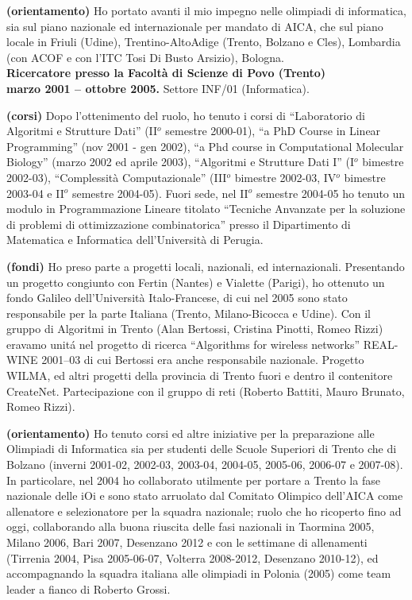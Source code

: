 \documentclass[10pt]{article}
\newcommand{\subvoice}[1] { {\large \bf #1} \smallskip\\ }
\begin{document}
{\bf (orientamento)} Ho portato avanti il mio impegno nelle olimpiadi di informatica,
sia sul piano nazionale ed internazionale per mandato di AICA,
che sul piano locale in Friuli (Udine), Trentino-AltoAdige (Trento, Bolzano e Cles), Lombardia (con ACOF e con l'ITC Tosi Di Busto Arsizio), Bologna.\\



\subvoice{Ricercatore presso la
          Facolt\`a di Scienze di Povo (Trento)}
{\bf marzo 2001 -- ottobre 2005.}
Settore INF/01 (Informatica).

{\bf (corsi)} Dopo l'ottenimento del ruolo,
ho tenuto i corsi di ``Laboratorio di Algoritmi e Strutture Dati''
(II$^o$ semestre 2000-01),
``a PhD Course in Linear Programming'' (nov 2001 - gen 2002),
``a Phd course in Computational Molecular Biology'' (marzo 2002 ed aprile 2003),
``Algoritmi e Strutture Dati I'' (I$^o$ bimestre 2002-03),
``Complessit\`a Computazionale'' (III$^o$ bimestre 2002-03,
IV$^o$ bimestre 2003-04 e II$^o$ semestre 2004-05).
Fuori sede, nel II$^o$ semestre 2004-05
ho tenuto un modulo in Programmazione Lineare
titolato ``Tecniche Anvanzate per la soluzione di problemi di ottimizzazione
combinatorica''
presso il Dipartimento di Matematica e Informatica
dell'Universit\`a di Perugia.

{\bf (fondi)} Ho preso parte a progetti locali, nazionali, ed internazionali.
Presentando un progetto congiunto con Fertin (Nantes) e Vialette (Parigi),
ho ottenuto un fondo Galileo dell'Universit\`a Italo-Francese,
di cui nel 2005 sono stato responsabile
per la parte Italiana (Trento, Milano-Bicocca e Udine).
Con il gruppo di Algoritmi in Trento (Alan Bertossi, Cristina Pinotti, Romeo Rizzi)
eravamo unit\'a nel progetto di ricerca ``Algorithms for wireless networks''
REAL-WINE 2001--03 di cui Bertossi era anche responsabile nazionale.
Progetto WILMA, ed altri progetti della provincia di Trento fuori e dentro il contenitore CreateNet. Partecipazione con il gruppo di reti (Roberto Battiti, Mauro Brunato, Romeo Rizzi).

{\bf (orientamento)} Ho tenuto corsi ed altre iniziative
per la preparazione alle Olimpiadi di Informatica
sia per studenti delle Scuole Superiori di Trento
che di Bolzano
(inverni 2001-02, 2002-03, 2003-04, 2004-05, 2005-06, 2006-07 e 2007-08).
In particolare, nel 2004 ho collaborato utilmente
per portare a Trento la fase nazionale delle iOi
e sono stato arruolato dal
Comitato Olimpico dell'AICA come allenatore e selezionatore
per la squadra nazionale;
ruolo che ho ricoperto fino ad oggi,
collaborando alla buona riuscita delle fasi nazionali
in Taormina 2005, Milano 2006, Bari 2007, Desenzano 2012
e con le settimane di allenamenti (Tirrenia 2004,
Pisa 2005-06-07, Volterra 2008-2012, Desenzano 2010-12),
ed accompagnando la squadra italiana alle olimpiadi
in Polonia (2005) come team leader a fianco di Roberto Grossi.
\end{document}
